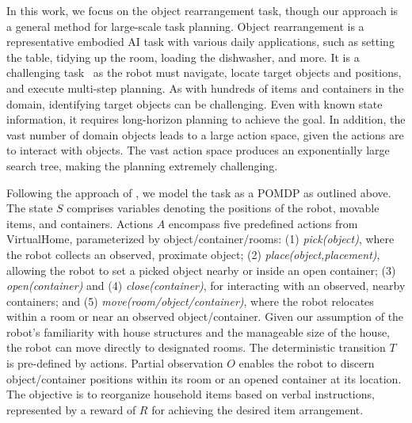 In this work, we focus on the object rearrangement task, though our approach is a general method for large-scale task planning. Object rearrangement is a representative embodied AI task \cite{batra2020rearrangement, szot2021habitat, weihs2021visual, kant2022housekeep, huang2019large} with various daily applications, such as setting the table, tidying up the room, loading the dishwasher, and more. It is a challenging task~\cite{batra2020rearrangement} as the robot must navigate, locate target objects and positions, and execute multi-step planning. As with hundreds of items and containers in the domain, identifying target objects can be challenging. Even with known state information, it requires long-horizon planning to achieve the goal. In addition, the vast number of domain objects leads to a large action space, given the actions are to interact with objects. The vast action space produces an exponentially large search tree, making the planning extremely challenging.

Following the approach of \cite{li2022pre, puig2020watch, Singh2023progprompt}, we model the task as a POMDP as outlined above. The state $S$ comprises variables denoting the positions of the robot, movable items, and containers. Actions $A$ encompass five predefined actions from VirtualHome, parameterized by object/container/rooms: (1) \emph{pick(object)}, where the robot collects an observed, proximate object; (2) \emph{place(object,placement)}, allowing the robot to set a picked object nearby or inside an open container; (3) \emph{open(container)} and (4) \emph{close(container)}, for interacting with an observed, nearby containers; and (5) \emph{move(room/object/container)}, where the robot relocates within a room or near an observed object/container. Given our assumption of the robot's familiarity with house structures and the manageable size of the house, the robot can move directly to designated rooms. The deterministic transition $T$ is pre-defined by actions. Partial observation $O$ enables the robot to discern object/container positions within its room or an opened container at its location. The objective is to reorganize household items based on verbal instructions, represented by a reward of $R$ for achieving the desired item arrangement. 


